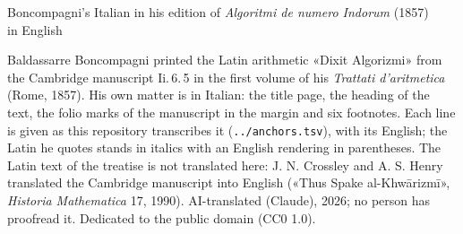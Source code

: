 \documentclass[11pt]{article}
\begin{document}
\begin{center}{\Large Boncompagni's Italian in his edition of \textit{Algoritmi de numero Indorum} (1857)}\\[1mm]
{\large in English}\end{center}
{\small Baldassarre Boncompagni printed the Latin arithmetic «Dixit Algorizmi» from the Cambridge manuscript Ii.\,6.\,5
in the first volume of his \textit{Trattati d'aritmetica} (Rome, 1857). His own matter is in Italian: the title page,
the heading of the text, the folio marks of the manuscript in the margin and six footnotes. Each line is given as this
repository transcribes it (\texttt{../anchors.tsv}), with its English; the Latin he quotes stands in italics with an
English rendering in parentheses. The Latin text of the treatise is not translated here: J. N. Crossley and A. S.
Henry translated the Cambridge manuscript into English («Thus Spake al-Khwārizmī», \textit{Historia Mathematica} 17,
1990). AI-translated (Claude), 2026; no person has proofread it. Dedicated to the public domain (CC0 1.0).}
\medskip
\end{document}
